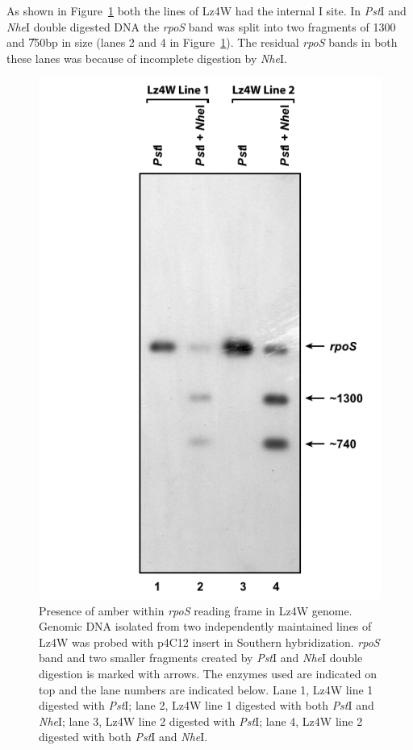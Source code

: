 As shown in Figure~\ref{chap3:amber} both the lines of Lz4W had
the internal I site. In \emph{Pst}I and \emph{Nhe}I double
digested DNA the \emph{rpoS} band was split into two fragments of
1300 and \U{750}{bp} in size (lanes 2 and 4 in
Figure~\ref{chap3:amber}). The residual \emph{rpoS} bands in both
these lanes was because of incomplete digestion by \emph{Nhe}I.
\begin{figure}[tbp]
\centering
\includegraphics{figures/chap3_amber}
\caption[Presence of amber with \emph{rpoS} reading
frame]{Presence of amber within \emph{rpoS} reading frame in Lz4W
genome. Genomic DNA isolated from two independently maintained
lines of Lz4W was probed with p4C12 insert in Southern
hybridization. \emph{rpoS} band and two smaller fragments created
by \emph{Pst}I and \emph{Nhe}I double digestion is marked with
arrows. The enzymes used are indicated on top and the lane numbers
are indicated below. Lane 1, Lz4W line 1 digested with
\emph{Pst}I; lane 2, Lz4W line 1 digested with both \emph{Pst}I
and \emph{Nhe}I; lane 3, Lz4W line 2 digested with \emph{Pst}I;
lane 4, Lz4W line 2 digested with both \emph{Pst}I and
\emph{Nhe}I.} \label{chap3:amber}
\end{figure}
